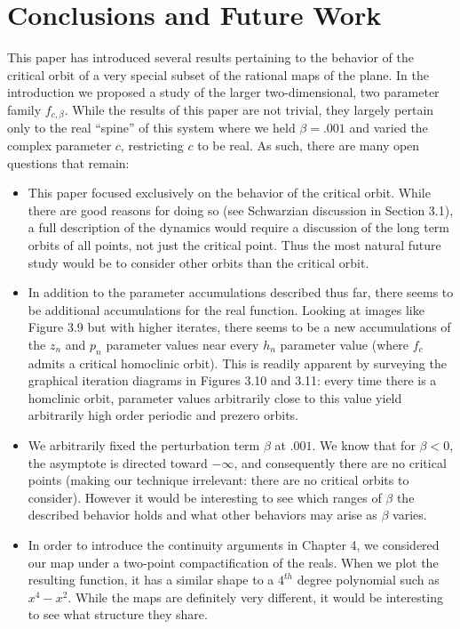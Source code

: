 \chapter{Conclusions and Future Work}

This paper has introduced several results pertaining to the behavior of the critical orbit of a very special subset of the  rational maps of the plane. In the introduction we proposed a study of the larger two-dimensional, two parameter family $f_{c,\beta}$. While the results of this paper are not trivial, they largely pertain only to the real ``spine'' of this system where we held $\beta = .001$ and varied the complex parameter $c$, restricting $c$ to be real. As such, there are many open questions that remain:

\begin{itemize}
	\item This paper focused exclusively on the behavior of the critical orbit. While there are good reasons for doing so (see Schwarzian discussion in Section 3.1), a full description of the dynamics would require a discussion of the long term orbits of all points, not just the critical point. Thus the most natural future study would be to consider other orbits than the critical orbit. 

	\item In addition to the parameter accumulations described thus far, there seems to be additional accumulations for the real function. Looking at images like Figure 3.9 but with higher iterates, there seems to be a new accumulations of the $z_n$ and $p_n$ parameter values near every $h_n$ parameter value (where $f_{c}$ admits a critical homoclinic orbit). This is readily apparent by surveying the graphical iteration diagrams in Figures 3.10 and 3.11: every time there is a homclinic orbit, parameter values arbitrarily close to this value yield arbitrarily high order periodic and prezero orbits.

	\item We arbitrarily fixed the perturbation term $\beta $ at $.001$. We know that for $\beta < 0$, the asymptote is directed toward $-\infty$, and consequently there are no critical points (making our technique irrelevant: there are no critical orbits to consider). However it would be interesting to see which ranges of $\beta$ the described behavior holds and what other behaviors may arise as $\beta$ varies.


	\item In order to introduce the continuity arguments in Chapter 4,  we considered our map under a two-point compactification of the reals. When we plot the resulting function, it has a similar shape to a $4^{th}$ degree polynomial such as $x^4 - x^2$. While the maps are definitely very different, it would be interesting to see what structure they share.


\end{itemize}
